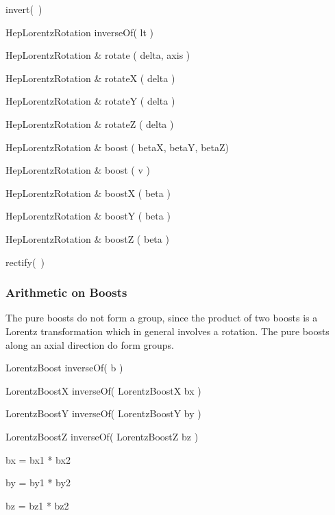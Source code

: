 \begin{shortlist}
  \item invert(~)
  \item HepLorentzRotation inverseOf( lt )
\end{shortlist}

\begin{shortlist}
  \item HepLorentzRotation \& rotate ( delta, axis ) 	\see{\ref{eq:ltrot}}
  \item HepLorentzRotation \& rotateX ( delta ) 
  \item HepLorentzRotation \& rotateY ( delta ) 
  \item HepLorentzRotation \& rotateZ ( delta ) 
  \item HepLorentzRotation \& boost ( betaX, betaY, betaZ) \see{\ref{eq:ltboost}}
  \item HepLorentzRotation \& boost ( v )		\see{\ref{eq:ltboost}}
  \item HepLorentzRotation \& boostX ( beta ) 
  \item HepLorentzRotation \& boostY ( beta ) 
  \item HepLorentzRotation \& boostZ ( beta ) 
\end{shortlist}

\begin{shortlist}
  \item rectify(~)					\see{\ref{eq:rectLT}}
\end{shortlist}

\subsubsection{Arithmetic on Boosts}

The pure boosts do not form a group, since the product of two 
boosts is a Lorentz transformation which in general involves a rotation.
The pure boosts along an axial direction do form groups.

\begin{shortlist}
  \item LorentzBoost inverseOf( b )
  \item LorentzBoostX inverseOf( LorentzBoostX bx )
  \item LorentzBoostY inverseOf( LorentzBoostY by )
  \item LorentzBoostZ inverseOf( LorentzBoostZ bz )
\end{shortlist}

\begin{shortlist}
  \item bx = bx1 * bx2
  \item by = by1 * by2
  \item bz = bz1 * bz2
\end{shortlist}


